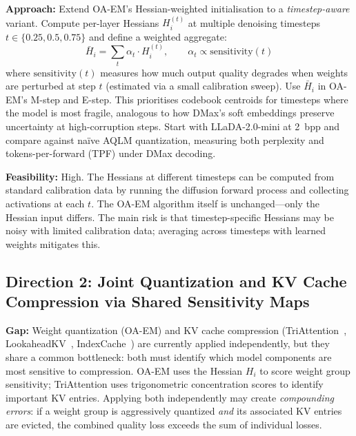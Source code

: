 \documentclass[11pt]{article}
\begin{document}
\textbf{Approach:} Extend OA-EM's Hessian-weighted initialisation to a \textit{timestep-aware} variant. Compute per-layer Hessians $H_{i}^{(t)}$ at multiple denoising timesteps $t \in \{0.25, 0.5, 0.75\}$ and define a weighted aggregate:
\begin{equation}
    \bar{H}_{i} = \sum_{t} \alpha_t \cdot H_{i}^{(t)}, \qquad \alpha_t \propto \mathrm{sensitivity}(t)
\end{equation}
where $\mathrm{sensitivity}(t)$ measures how much output quality degrades when weights are perturbed at step $t$ (estimated via a small calibration sweep). Use $\bar{H}_{i}$ in OA-EM's M-step and E-step. This prioritises codebook centroids for timesteps where the model is most fragile, analogous to how DMax's soft embeddings preserve uncertainty at high-corruption steps. Start with LLaDA-2.0-mini at 2~bpp and compare against na\"ive AQLM quantization, measuring both perplexity and tokens-per-forward (TPF) under DMax decoding.

\textbf{Feasibility:} High. The Hessians at different timesteps can be computed from standard calibration data by running the diffusion forward process and collecting activations at each $t$. The OA-EM algorithm itself is unchanged---only the Hessian input differs. The main risk is that timestep-specific Hessians may be noisy with limited calibration data; averaging across timesteps with learned weights mitigates this.

\subsection{Direction 2: Joint Quantization and KV Cache Compression via Shared Sensitivity Maps}

\textbf{Gap:} Weight quantization (OA-EM) and KV cache compression (TriAttention~\cite{triattention}, LookaheadKV~\cite{lookaheadkv}, IndexCache~\cite{indexcache}) are currently applied independently, but they share a common bottleneck: both must identify which model components are most sensitive to compression. OA-EM uses the Hessian $H_{i}$ to score weight group sensitivity; TriAttention uses trigonometric concentration scores to identify important KV entries. Applying both independently may create \textit{compounding errors}: if a weight group is aggressively quantized \textit{and} its associated KV entries are evicted, the combined quality loss exceeds the sum of individual losses.
\end{document}
